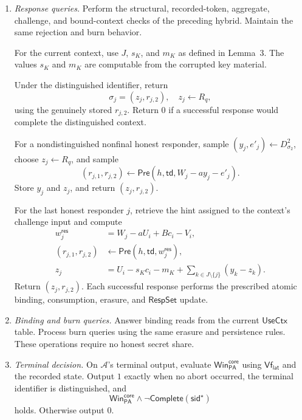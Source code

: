 \documentclass[lettersize,journal]{IEEEtran}
\begin{document}
\begin{enumerate}
For a new honest token under a nondistinguished identifier,
sample $W_j\leftarrow R_q$ and store its unopened record.
In both cases, return the public token
$(j,\mathsf{sid},W_j)$.

\item \emph{Response queries.}
Perform the structural, recorded-token, aggregate,
challenge, and bound-context checks of the preceding hybrid.
Maintain the same rejection and burn behavior.

For the current context, use $J$, $s_K$, and $m_K$
as defined in Lemma~3.
The values $s_K$ and $m_K$ are computable from the
corrupted key material.

Under the distinguished identifier, return
\[
\sigma_j=(z_j,r_{j,2}),
\quad z_j\leftarrow R_q,
\]
using the genuinely stored $r_{j,2}$.
Return $0$ if a successful response would complete
the distinguished context.

For a nondistinguished nonfinal honest responder,
sample $(y_j,e'_j)\leftarrow D_{\sigma_2}^{2}$,
choose $z_j\leftarrow R_q$, and sample
\[
(r_{j,1},r_{j,2})\leftarrow
\mathsf{Pre}(h,\mathsf{td},W_j-ay_j-e'_j).
\]
Store $y_j$ and $z_j$, and return $(z_j,r_{j,2})$.

For the last honest responder $j$, retrieve the hint
assigned to the context's challenge input and compute
\begin{equation}
\begin{aligned}
w_j^{\mathsf{res}}
  &=W_j-aU_i+Bc_i-V_i,\\
(r_{j,1},r_{j,2})
  &\leftarrow
    \mathsf{Pre}(h,\mathsf{td},w_j^{\mathsf{res}}),\\
z_j
  &=U_i-s_Kc_i-m_K
    +\sum_{k\in J\setminus\{j\}}(y_k-z_k).
\end{aligned}
\label{eq:app-talon-hint-simulation}
\end{equation}
Return $(z_j,r_{j,2})$.
Each successful response performs the prescribed atomic
binding, consumption, erasure, and $\mathsf{RespSet}$ update.

\item \emph{Binding and burn queries.}
Answer binding reads from the current $\mathsf{UseCtx}$ table.
Process burn queries using the same erasure and persistence rules.
These operations require no honest secret share.

\item \emph{Terminal decision.}
On $\mathcal A$'s terminal output, evaluate
$\mathsf{Win}_{\mathsf{PA}}^{\mathsf{core}}$
using $\mathsf{Vf}_{\mathsf{lat}}$ and the recorded state.
Output $1$ exactly when no abort occurred,
the terminal identifier is distinguished, and
\[
\mathsf{Win}_{\mathsf{PA}}^{\mathsf{core}}
\wedge
\neg\mathsf{Complete}(\mathsf{sid}^{\star})
\]
holds.
Otherwise output $0$.
\end{enumerate}
\end{document}

